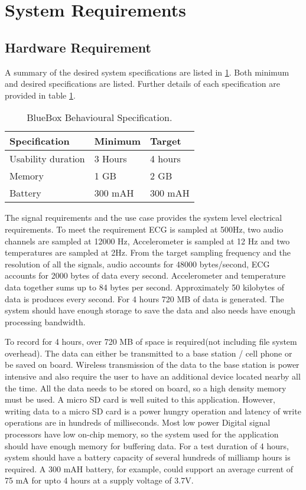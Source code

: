 \section{System Requirements}\label{system requirements}
\subsection{Hardware Requirement}

A summary of the desired system specifications are listed in \ref{table:Behavioural_specs}. Both minimum and desired specifications are listed. Further details of each specification are provided in table \ref{table:Behavioural_specs}.
\begin{table}[h]
	\centering
	\begin{tabular}{|l|l|l|}
		\hline
		Specification & Minimum & Target \\
		\hline
		Usability duration & 3 Hours & 4 hours \\
		Memory & 1 GB & 2 GB \\
		Battery & 300 mAH & 300 mAH \\
		\hline
	\end{tabular}
	\caption{BlueBox Behavioural Specification.}
	\label{table:Behavioural_specs}
\end{table}

The signal requirements and the use case provides the system level electrical requirements. To meet the requirement ECG is sampled at 500Hz, two audio channels are sampled at 12000 Hz, Accelerometer is sampled at 12 Hz and two temperatures are sampled at 2Hz. From the target sampling frequency and the resolution of all the signals, audio accounts for 48000 bytes/second, ECG accounts for 2000 bytes of data every second. Accelerometer and temperature data together sums up to 84 bytes per second. Approximately 50 kilobytes of data is produces every second. For 4 hours 720 MB of data is generated. The system should have enough storage to save the data and also needs have enough processing bandwidth. 

 To record for 4 hours, over 720 MB of space is required(not including file system overhead). The data can either be transmitted to a base station / cell phone or be saved on board. Wireless transmission of the data to the base station is power intensive and also require the user to have an additional device located nearby all the time. All the data needs to be stored on board, so a high density memory must be used. A micro SD card is well suited to this application. However, writing data to a micro SD card is a power hungry operation and latency of write operations are in hundreds of milliseconds. Most low power Digital signal processors have low on-chip memory, so the system used for the application should have enough memory for buffering data. For a test duration of 4 hours, system should have a battery capacity of several hundreds of milliamp hours is required. A 300 mAH battery, for example, could support an average current of 75 mA for upto 4 hours at a supply voltage of 3.7V. 

